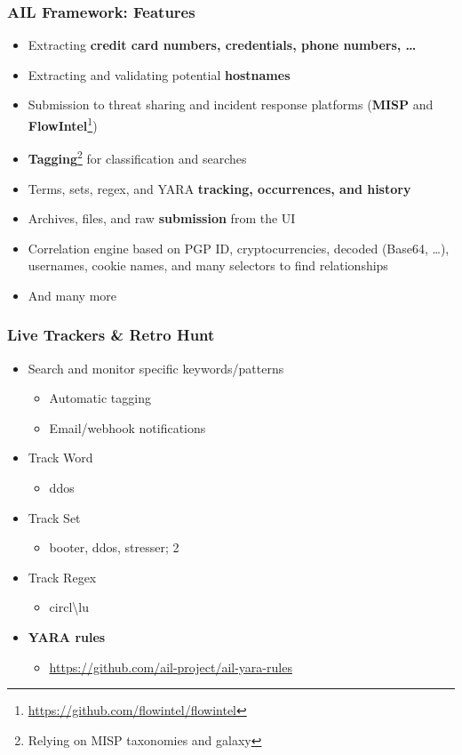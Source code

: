 \documentclass{beamer}
\begin{document}
\begin{frame}
    \frametitle{AIL Framework: Features}
    \begin{itemize}
        \item Extracting \textbf{credit card numbers, credentials, phone numbers, \dots}
        \item Extracting and validating potential \textbf{hostnames}
        \item Submission to threat sharing and incident response platforms (\textbf{MISP} and \textbf{FlowIntel}\footnote{\url{https://github.com/flowintel/flowintel}})
        \item \textbf{Tagging}\footnote{Relying on MISP taxonomies and galaxy} for classification and searches
        \item Terms, sets, regex, and YARA \textbf{tracking, occurrences, and history}
        \item Archives, files, and raw \textbf{submission} from the UI
        \item Correlation engine based on PGP ID, cryptocurrencies, decoded (Base64, \dots), usernames, cookie names, and many selectors to find relationships
        \item And many more
    \end{itemize}
\end{frame}


\begin{frame}
	\frametitle{Live Trackers \& Retro Hunt}
    \begin{itemize}
        \item Search and monitor specific keywords/patterns
        \begin{itemize}
            \item Automatic tagging
            \item Email/webhook notifications
        \end{itemize}
        \item Track Word
        \begin{itemize}
            \item ddos
        \end{itemize}
        \item Track Set
        \begin{itemize}
            \item booter, ddos, stresser; 2
        \end{itemize}
        \item Track Regex
        \begin{itemize}
            \item circl\textbackslash lu
        \end{itemize}
        \item {\bf YARA rules}
        \begin{itemize}
            \item \url{https://github.com/ail-project/ail-yara-rules}
        \end{itemize}
    \end{itemize}
\end{frame}
\end{document}

